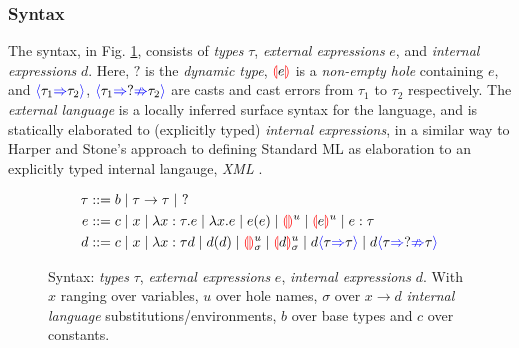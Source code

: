\subsubsection{Syntax}
\par The syntax, in Fig. \ref{fig:syntax}, consists of \textit{types} $\tau$, \textit{external expressions} $e$, and \textit{internal expressions} $d$. Here, $?$ is the \textit{dynamic type}, $\hole[e]$ is a \textit{non-empty hole} containing $e$, and $\scast{\tau_1}{\tau_2}$,  $\scasterror{\tau_1}{\tau_2}$ are casts and cast errors from $\tau_1$ to $\tau_2$ respectively.
The \textit{external language} is a locally inferred \cite{LocalInference} surface syntax for the language, and is statically elaborated to (explicitly typed) \textit{internal expressions}, in a similar way to Harper and Stone's \cite{StandardMLTypeTheory} approach to defining Standard ML as elaboration to an explicitly typed internal langauge, \textit{XML} \cite{CoreXML}.
\begin{figure}[h]
\begin{align*}
\tau &::= b \mid \tau \to \tau \mid\  ?\\
e &::= c \mid x \mid \lambda x : \tau.e \mid \lambda x. e \mid e(e) \mid \hole^u \mid \hole[e]^u \mid e : \tau\\
d &::= c \mid x \mid \lambda x : \tau d \mid d(d) \mid \hole^u_\sigma \mid \hole[d]^u_\sigma \mid d\scast{\tau}{\tau} \mid d\scasterror{\tau}{\tau}
\end{align*}
\caption{Syntax: \textit{types} $\tau$, \textit{external expressions} $e$, \textit{internal expressions} $d$. With $x$ ranging over variables, $u$ over hole names, $\sigma$ over $x \to d$ \textit{internal language} substitutions/environments, $b$ over base types and $c$ over constants.}
\label{fig:syntax}
\end{figure}

